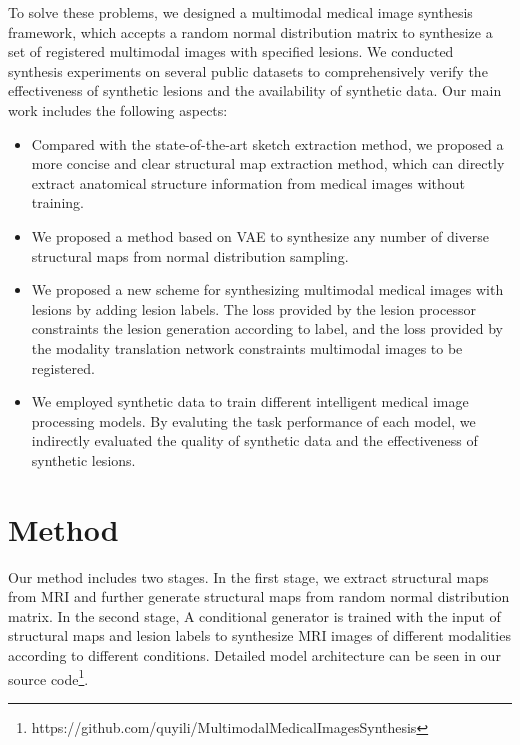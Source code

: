 \documentclass[runningheads]{llncs}
\begin{document}
	To solve these problems, we designed a multimodal medical image synthesis framework, which accepts a random normal distribution matrix to synthesize a set of registered multimodal images with specified lesions. We conducted synthesis experiments on several public datasets to comprehensively verify the effectiveness of synthetic lesions and the availability of synthetic data. Our main work includes the following aspects:
	\begin{itemize}
		\item Compared with the state-of-the-art sketch extraction method, we proposed a more concise and clear structural map extraction method, which can directly extract anatomical structure information from medical images without training.
		\item We proposed a method based on VAE to synthesize any number of diverse structural maps from normal distribution sampling.
		\item We proposed a new scheme for synthesizing multimodal medical images with lesions by adding lesion labels. The loss provided by the lesion processor constraints the lesion generation according to label, and the loss provided by the modality translation network constraints multimodal images to be registered.
		\item We employed synthetic data to train different intelligent medical image processing models. By evaluting the task performance of each model, we indirectly evaluated the quality of synthetic data and the effectiveness of synthetic lesions.
	\end{itemize}
	
	\section{Method}
	\label{method}
	Our method includes two stages. In the first stage, we extract structural maps from MRI and further generate structural maps from random normal distribution matrix. In the second stage, A conditional generator is trained with the input of structural maps and lesion labels to synthesize MRI images of different modalities according to different conditions. Detailed model architecture can be seen in our source code\footnote{https://github.com/quyili/MultimodalMedicalImagesSynthesis}.
	
\end{document}
